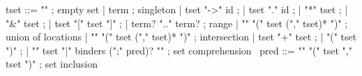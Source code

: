 \begin{syntax}
  tset ::= "\empty" ; empty set
       | term ; singleton
       | tset "->" id ;
       | tset "." id ;
       | "*" tset ;
       | "&" tset ;
       | tset "[" tset "]" ;
       | term? ".." term? ; range
       | "\union" "(" tset ("," tset)* ")" ; union of locations
       | "\inter" "(" tset ("," tset)* ")" ; intersection
       | tset "+" tset ;
       | "(" tset ")" ;
       | "{" tset "|" binders (";" pred)? "}" ; set comprehension
       \
  pred ::= {"\subset" "(" tset "," tset ")"} ; set inclusion
\end{syntax}

